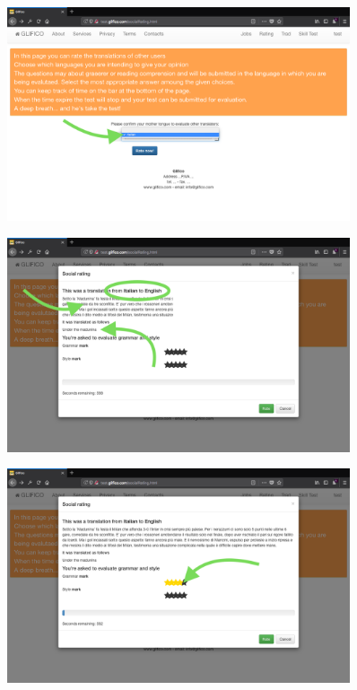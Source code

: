 \documentclass[11 pt, a4paper]{article}
\begin{document}
\clearpage
\begin{figure}[H]
\centering
\includegraphics[width=0.9\textwidth]{translator_socialrating2.png}
\end{figure}


\begin{figure}[H]
\centering
\includegraphics[width=0.9\textwidth]{translator_socialrating3.png}
\end{figure}


\clearpage
\begin{figure}[H]
\centering
\includegraphics[width=0.9\textwidth]{translator_socialrating4.png}
\end{figure}
\end{document}
